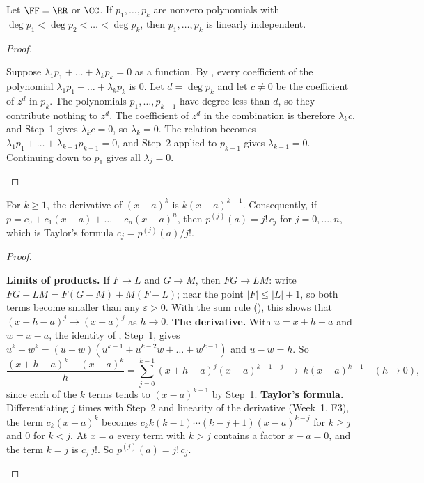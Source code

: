 \documentclass[10pt]{scrartcl}
\begin{document}
\begin{proposition*}
  Let $\FF=\RR$ or $\CC$. If $p_1,\dots,p_k$ are nonzero polynomials with $\deg p_1<\deg p_2<\dots<\deg p_k$, then $p_1,\dots,p_k$ is linearly independent.
\end{proposition*}
\begin{proof}
  \begin{steps}
    \ii Suppose $\lambda_1p_1+\dots+\lambda_kp_k=0$ as a function. By , every coefficient of the polynomial $\lambda_1p_1+\dots+\lambda_kp_k$ is $0$.
    \ii Let $d=\deg p_k$ and let $c\ne0$ be the coefficient of $z^d$ in $p_k$. The polynomials $p_1,\dots,p_{k-1}$ have degree less than $d$, so they contribute nothing to $z^d$. The coefficient of $z^d$ in the combination is therefore $\lambda_kc$, and Step~1 gives $\lambda_kc=0$, so $\lambda_k=0$.
    \ii The relation becomes $\lambda_1p_1+\dots+\lambda_{k-1}p_{k-1}=0$, and Step~2 applied to $p_{k-1}$ gives $\lambda_{k-1}=0$. Continuing down to $p_1$ gives all $\lambda_j=0$.
  \end{steps}
\end{proof}

\begin{proposition*}
  For $k\ge1$, the derivative of $(x-a)^k$ is $k(x-a)^{k-1}$. Consequently, if $p=c_0+c_1(x-a)+\dots+c_n(x-a)^n$, then $p^{(j)}(a)=j!\,c_j$ for $j=0,\dots,n$, which is Taylor's formula $c_j=p^{(j)}(a)/j!$.
\end{proposition*}
\begin{proof}
  \begin{steps}
    \ii \textbf{Limits of products.} If $F\to L$ and $G\to M$, then $FG\to LM$: write $FG-LM=F(G-M)+M(F-L)$; near the point $|F|\le|L|+1$, so both terms become smaller than any $\varepsilon>0$. With the sum rule (), this shows that $(x+h-a)^j\to(x-a)^j$ as $h\to0$.
    \ii \textbf{The derivative.} With $u=x+h-a$ and $w=x-a$, the identity of , Step~1, gives $u^k-w^k=(u-w)(u^{k-1}+u^{k-2}w+\dots+w^{k-1})$ and $u-w=h$. So
    \[
      \frac{(x+h-a)^k-(x-a)^k}{h}=\sum_{j=0}^{k-1}(x+h-a)^{j}(x-a)^{k-1-j}\ \longrightarrow\ k(x-a)^{k-1}\quad(h\to0),
    \]
    since each of the $k$ terms tends to $(x-a)^{k-1}$ by Step~1.
    \ii \textbf{Taylor's formula.} Differentiating $j$ times with Step~2 and linearity of the derivative (Week~1, F3), the term $c_k(x-a)^k$ becomes $c_kk(k-1)\cdots(k-j+1)(x-a)^{k-j}$ for $k\ge j$ and $0$ for $k<j$. At $x=a$ every term with $k>j$ contains a factor $x-a=0$, and the term $k=j$ is $c_j\,j!$. So $p^{(j)}(a)=j!\,c_j$.
  \end{steps}
\end{proof}
\end{document}
